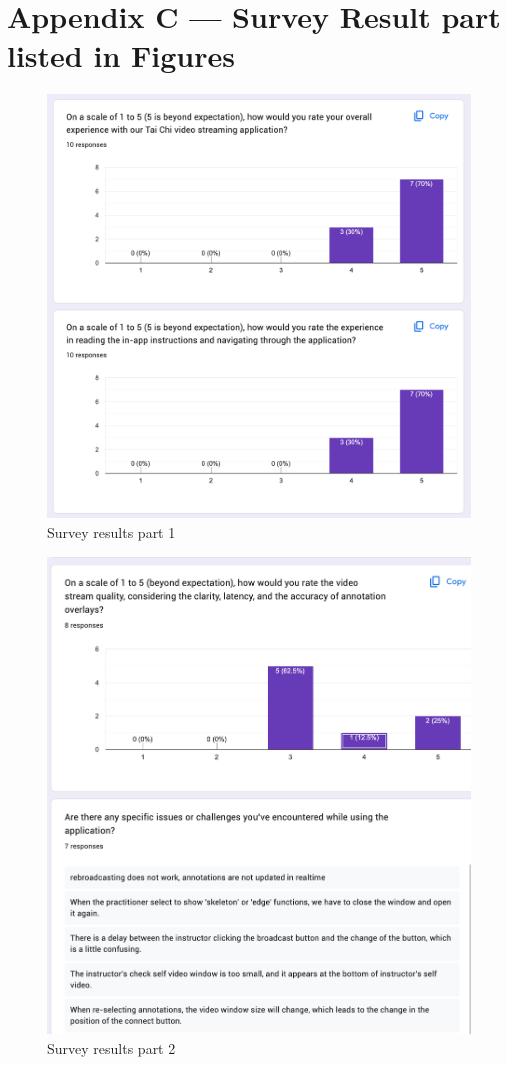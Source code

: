 \documentclass[12pt, titlepage]{article}
\begin{document}
\section*{Appendix C --- Survey Result part listed in Figures}
\FloatBarrier
\begin{figure}[h!]
  \centering
  \includegraphics[width=1.0\linewidth]{surveyp1.png}
  \caption{Survey results part 1}
  \label{fig:surveyp1}
\end{figure}

\begin{figure}[!]
  \centering
  \includegraphics[width=1.0\linewidth]{surveyp2.png}
  \caption{Survey results part 2}
  \label{fig:surveyp2}
\end{figure}
\end{document}
